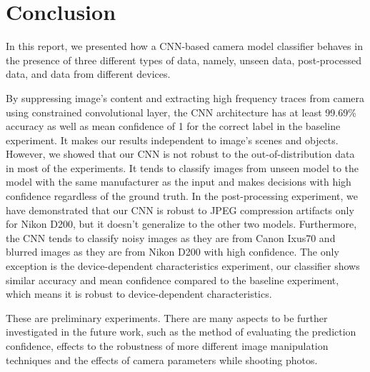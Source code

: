 \documentclass[a4paper, 9pt, twocolumn]{extarticle}
\begin{document}
\section{Conclusion}
\label{section:conclusion}

In this report, we presented how a CNN-based camera model classifier behaves in the presence of three different types of data, namely, unseen data, post-processed data, and data from different devices.

By suppressing image’s content and extracting high frequency traces from camera using constrained convolutional layer, the CNN architecture has at least 99.69\% accuracy as well as mean confidence of 1 for the correct label in the baseline experiment. It makes our results independent to image's scenes and objects. However, we showed that our CNN is not robust to the out-of-distribution data in most of the experiments. It tends to classify images from unseen model to the model with the same manufacturer as the input and makes decisions with high confidence regardless of the ground truth. In the post-processing experiment, we have demonstrated that our CNN is robust to JPEG compression artifacts only for Nikon D200, but it doesn't generalize to the other two models. Furthermore, the CNN tends to classify noisy images as they are from Canon Ixus70 and blurred images as they are from Nikon D200 with high confidence. The only exception is the device-dependent characteristics experiment, our classifier shows similar accuracy and mean confidence compared to the baseline experiment, which means it is robust to device-dependent characteristics.

These are preliminary experiments. There are many aspects to be further investigated in the future work, such as the method of evaluating the prediction confidence, effects to the robustness of more different image manipulation techniques and the effects of camera parameters while shooting photos.	

%

\small

\end{document}
